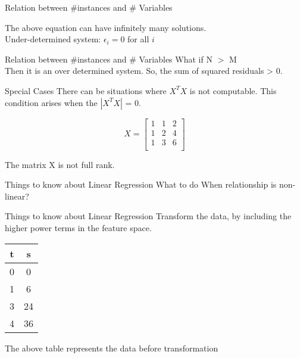 \documentclass{beamer}
\begin{document}
\begin{frame}{Relation between \#instances and \# Variables}
            
    
    
    
    The above equation can have infinitely many solutions. \\
    Under-determined system: $\epsilon_{i} = 0$ for all $i$

\end{frame}

\begin{frame}{Relation between \#instances and \# Variables}
    What if N $>$ M\\
    Then it is an over determined system. So, the sum of squared residuals > 0.
\end{frame}
\begin{frame}{Special Cases}
There can be situations where $X^{T}X$ is not computable. This condition arises when the $|X^{T}X|$ = 0.

\begin{equation}
    X = \begin{bmatrix}
        1 & 1& 2\\
        1 & 2& 4\\
        1 & 3& 6\\
    \end{bmatrix}
\end{equation}

The matrix X is not full rank. 
\end{frame}


\begin{frame}{Things to know about Linear Regression}
    What to do When relationship is non-linear?
\end{frame}


\begin{frame}{Things to know about Linear Regression}
    Transform the data, by including the higher power terms in the feature space. 
    
       
    \begin{center}
 \begin{tabular}{||c c||} 
 \hline
 t  & s \\ [0.5ex] 
 \hline\hline
 0 & 0 \\
 1 & 6 \\
 3 & 24 \\
 4 & 36 \\
 \hline
\end{tabular}
\end{center}

The above table represents the data before transformation
\end{frame}
\end{document}
